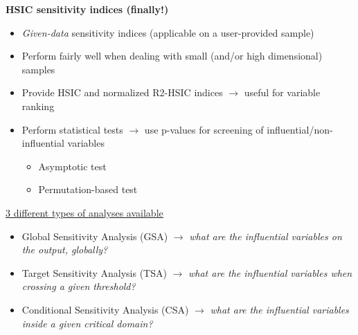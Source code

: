 \documentclass{beamer}
\begin{document}
\begin{frame}
\begin{small}

\textbf{HSIC sensitivity indices (finally!)}

\begin{itemize}
\item \emph{Given-data} sensitivity indices (applicable on a user-provided sample)
\item Perform fairly well when dealing with small (and/or high dimensional) samples
\item Provide HSIC and normalized R2-HSIC indices $\rightarrow$ useful  for variable ranking
\item Perform statistical tests $\rightarrow$ use p-values for screening of influential/non-influential variables
\begin{itemize}
\item Asymptotic test
\item Permutation-based test
\end{itemize}
\end{itemize}

\vspace{12pt}

\underline{3 different types of analyses available}

\begin{itemize}
\item Global Sensitivity Analysis (GSA) $\rightarrow$ \emph{what are the influential variables on the output, globally?}
\item Target Sensitivity Analysis (TSA) $\rightarrow$ \emph{what are the influential variables when crossing a given threshold?}
\item Conditional Sensitivity Analysis (CSA) $\rightarrow$ \emph{what are the influential variables inside a given critical domain?}
\end{itemize}

\end{small}
\end{frame}
\end{document}
